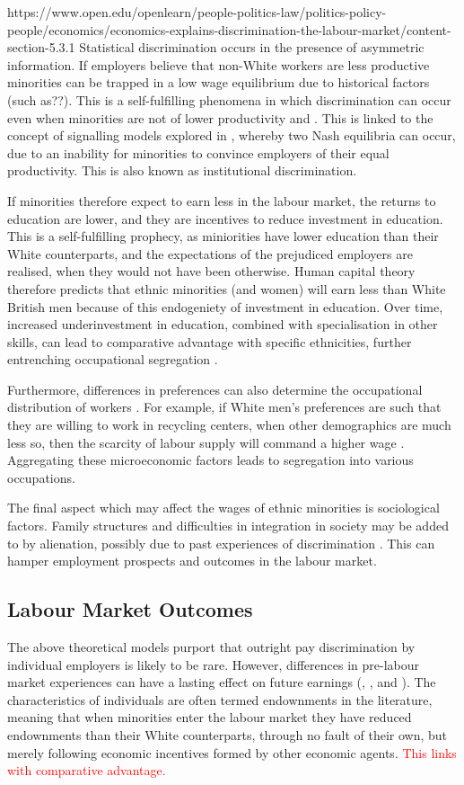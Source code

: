 \documentclass[class=article, crop=false]{standalone}
\begin{document}
https://www.open.edu/openlearn/people-politics-law/politics-policy-people/economics/economics-explains-discrimination-the-labour-market/content-section-5.3.1
Statistical discrimination occurs in the presence of asymmetric information. If employers believe that non-White workers are less productive minorities can be trapped in a low wage equilibrium due to historical factors (such as??). This is a self-fulfilling phenomena in which discrimination can occur even when minorities are not of lower productivity \citep{Arrow} and \citep{LundbergB}. This is linked to the concept of signalling models explored in \citet{Barr}, whereby two Nash equilibria can occur, due to an inability for minorities to convince employers of their equal productivity. This is also known as institutional discrimination.

If minorities therefore expect to earn less in the labour market, the returns to education are lower, and they are incentives to reduce investment in education. This is a self-fulfilling prophecy, as miniorities have lower education than their White counterparts, and the expectations of the prejudiced employers are realised, when they would not have been otherwise. Human capital theory therefore predicts that ethnic minorities (and women) will earn less than White British men because of this endogeniety of investment in education. Over time, increased underinvestment in education, combined with specialisation in other skills, can lead to comparative advantage with specific ethnicities, further entrenching occupational segregation \citep{Altonji}.

Furthermore, differences in preferences can also determine the occupational distribution of workers \citep{Thaler}. For example, if White men's preferences are such that they are willing to work in recycling centers, when other demographics are much less so, then the scarcity of labour supply will command a higher wage \citep{Altonji}. Aggregating these microeconomic factors leads to segregation into various occupations.

The final aspect which may affect the wages of ethnic minorities is sociological factors. Family structures and difficulties in integration in society may be added to by alienation, possibly due to past experiences of discrimination \citep{Berthoud}. This can hamper employment prospects and outcomes in the labour market.

\subsection{Labour Market Outcomes}
\label{sec:Labour Mkt Outcomes}
The above theoretical models purport that outright pay discrimination by individual employers is likely to be rare. However, differences in pre-labour market experiences can have a lasting effect on future earnings (\citet{Altonji}, \citet{Hedman}, and \citet{Berthoud}). The characteristics of individuals are often termed endownments in the literature, meaning that when minorities enter the labour market they have reduced endownments than their White counterparts, through no fault of their own, but merely following economic incentives formed by other economic agents. \textcolor{red}{This links with comparative advantage.}
\end{document}
